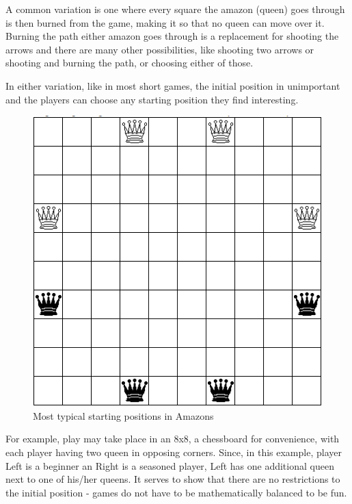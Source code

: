 A common variation is one where every square the amazon (queen) goes through is then burned from the game, making it so that no queen can move over it. Burning the path either amazon goes through is a replacement for shooting the arrows and there are many other possibilities, like shooting two arrows or shooting and burning the path, or choosing either of those.

In either variation, like in most short games, the initial position in unimportant and the players can choose any starting position they find interesting.

\begin{figure} [H]
	\begin{center}
		\includegraphics[scale=0.5]{sections/examples/amazons.png}
	\end{center}
\caption{Most typical starting positions in Amazons}
\end{figure}

For example, play may take place in an 8x8, a chessboard for convenience, with each player having two queen in opposing corners. Since, in this example, player Left is a beginner an Right is a seasoned player, Left has one additional queen next to one of his/her queens. It serves to show that there are no restrictions to the initial position - games do not have to be mathematically balanced to be fun.

